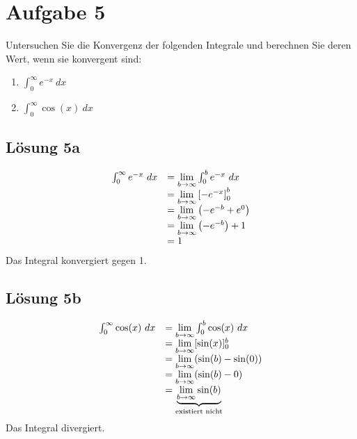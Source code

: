\documentclass[main.tex]{subfiles}
\begin{document}
\section{Aufgabe 5}
Untersuchen Sie die Konvergenz der folgenden Integrale und berechnen Sie deren Wert, wenn sie konvergent sind:

\begin{enumerate}
    \item $\int _{0}^{\infty } e^{-x} \ dx$
    \item $\int _{0}^{\infty }\cos( x) \ dx$
\end{enumerate}

\subsection{Lösung 5a}
\begin{equation*}
    \begin{array}{ c l }
        \int _{0}^{\infty } e^{-x} \ dx & =\lim\limits _{b\rightarrow \infty }\int _{0}^{b} e^{-x} \ dx\\
        & =\lim\limits _{b\rightarrow \infty }\left[ -e^{-x}\right]_{0}^{b}\\
        & =\lim\limits _{b\rightarrow \infty }\left( -e^{-b} +e^{0}\right)\\
        & =\lim\limits _{b\rightarrow \infty }\left( -e^{-b}\right) +1\\
        & =1
    \end{array}
\end{equation*}
Das Integral konvergiert gegen 1.

\subsection{Lösung 5b}
\begin{equation*}
    \begin{array}{ c l }
    \int _{0}^{\infty }\cos( x) \ dx & =\lim\limits _{b\rightarrow \infty }\int _{0}^{b}\cos( x) \ dx\\
     & =\lim\limits _{b\rightarrow \infty }[\sin( x)]_{0}^{b}\\
     & =\lim\limits _{b\rightarrow \infty }(\sin( b) -\sin( 0))\\
     & =\lim\limits _{b\rightarrow \infty }(\sin( b) -0)\\
     & =\underbrace{\lim\limits _{b\rightarrow \infty }\sin( b)}_{\text{existiert nicht}}
    \end{array}
\end{equation*}
Das Integral divergiert.
\end{document}
